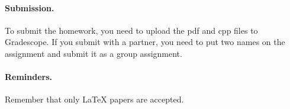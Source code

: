\documentclass{article}
\begin{document}

\vskip 0.1in
\paragraph{Submission.}
To submit the homework, you need to upload the pdf and cpp files to Gradescope. If you submit with a partner, you need
to put two names on the assignment and submit it as a group assignment.

\paragraph{Reminders.}
Remember that only {\LaTeX} papers are accepted. 
\end{document}
